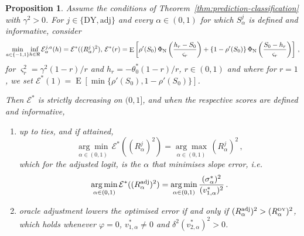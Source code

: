 \documentclass{article}
\DeclareMathOperator{\expect}{E}
\newtheorem{proposition}[theorem]{Proposition}
\theoremstyle{definition}
\begin{document}
\begin{bibunit}
\begingroup
\renewcommand{\thetheorem}{\arabic{theorem}}
\renewcommand{\theproposition}{\arabic{theorem}}
\setcounter{theorem}{1}
\begin{proposition}
\label{prop:prediction-comparison}
Assume the conditions of Theorem~\ref{thm:prediction-classification} with
$\gamma^2>0$. For $j\in\{\mathrm{DY},\mathrm{adj}\}$ and every
$\alpha\in(0,1)$ for which $S_\alpha^j$ is defined and informative, consider
\begin{equation}
\label{eq:prediction-mer-logits}
    \underset{a \in \{-1,1\}}{\min}\underset{h\in\Re}{\inf} \, \mathcal E_\alpha^{j,a}(h)
    =
    \mathcal E^*((R_\alpha^j)^2),
    \, 
    \mathcal E^*(r)
    =
    \expect\left[
        \rho'(S_0)\,\Phi_{\rm N}\left(\frac{h_r-S_0}{\varsigma_r}\right)
        +\left\{1-\rho'(S_0)\right\}
        \Phi_{\rm N}\left(\frac{S_0-h_r}{\varsigma_r}\right)
    \right] \,,
\end{equation}
for $\varsigma_r^2=\gamma^2(1-r)/r$ and
$h_r=-\theta_0^*(1-r)/r$, $r \in (0,1)$ and where for $r=1$, we set
$\mathcal E^*(1)=\expect[\min\{\rho'(S_0),1-\rho'(S_0)\}]$.

Then $\mathcal E^*$ is strictly decreasing on $(0,1]$, and when the respective scores are defined and informative, 
\begin{enumerate}[label=(\roman*)]
    \item up to ties, and if attained, 
    \begin{equation}
    \label{eq:prediction-optimal-alpha}
        \underset{\alpha \in (0,1)}{\arg\min}\, \mathcal E^*((R_\alpha^j)^2)
        =
        \underset{\alpha \in (0,1)}{\arg\max}\,\left(R_\alpha^j\right)^2 \,, 
    \end{equation}
    which for the adjusted logit, is the $\alpha$ that minimises slope error, i.e. 
    $$
        \underset{\alpha \in (0,1)}{\arg\min}\,
        \mathcal E^*((R_\alpha^{\rm adj})^2)
        =
        \underset{\alpha \in (0,1)}{\arg\min}\,
        \frac{(\sigma_\alpha^*)^2}{(v_{1,\alpha}^*)^2}\,.
    $$
    \item oracle
    adjustment lowers the optimised error if and only if
    $(R_\alpha^{\mathrm{adj}})^2>(R_\alpha^{\textrm{\tiny DY}})^2$, which
    holds whenever $\varphi=0$, $v_{1,\alpha}^*\neq0$ and
    $\delta^2(v_{2,\alpha}^*)^2>0$.
\end{enumerate}
\end{proposition}
\endgroup


\end{bibunit}
\end{document}
